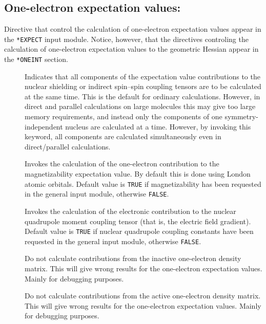 \subsection{One-electron expectation values:
}\label{sec:expect}

Directive that control the calculation of one-electron expectation
values appear in the \verb|*EXPECT| input module. Notice, however,
that the directives controling the calculation of one-electron
expectation values to the geometric Hessian appear in the
\verb|*ONEINT| section.

\begin{description}
\item[] Indicates that all components of the expectation
  value contributions to the nuclear
shielding or indirect spin--spin
  coupling
  tensors are to be calculated at the
same time. This is the 
default for ordinary calculations. However, in direct and parallel
calculations on large molecules this may give too large memory
requirements, and instead only the components of one symmetry-independent
nucleus are calculated at a time. However, by invoking
this keyword, all components are calculated simultaneously even in
direct/parallel calculations.

\item[] Invokes the calculation of the one-electron
contribution to the magnetizability expectation
value. By default this 
is done using London atomic orbitals. Default
value is \verb|TRUE| if 
magnetizability has been requested in the general input module,
otherwise \verb|FALSE|.

\item[] Invokes the calculation of the electronic
contribution to the nuclear quadrupole moment coupling
tensor (that
is, the electric field 
gradient). Default value is \verb|TRUE| if 
nuclear quadrupole coupling constants have been requested in the
general input module, otherwise \verb|FALSE|.

\item[] Do not calculate contributions from the inactive
one-electron density matrix. This will give wrong results for the
one-electron expectation values. Mainly for debugging purposes.

\item[] Do not calculate contributions from the active
one-electron density matrix. This will give wrong results for the
one-electron expectation values. Mainly for debugging purposes.


\end{description}
